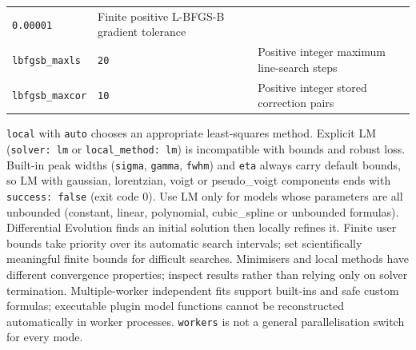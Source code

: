 \documentclass[
  10pt,
  a4paper,
  oneside]{scrreprt}
\begin{document}
\begin{longtable}[]{@{}lll@{}}
\begin{minipage}[t]{0.30\columnwidth}
\texttt{0.00001}\strut
\end{minipage} & \begin{minipage}[t]{0.30\columnwidth}\raggedright
Finite positive L-BFGS-B gradient tolerance\strut
\end{minipage}\tabularnewline
\begin{minipage}[t]{0.30\columnwidth}\raggedright
\texttt{lbfgsb\_maxls}\strut
\end{minipage} & \begin{minipage}[t]{0.30\columnwidth}\raggedright
\texttt{20}\strut
\end{minipage} & \begin{minipage}[t]{0.30\columnwidth}\raggedright
Positive integer maximum line-search steps\strut
\end{minipage}\tabularnewline
\begin{minipage}[t]{0.30\columnwidth}\raggedright
\texttt{lbfgsb\_maxcor}\strut
\end{minipage} & \begin{minipage}[t]{0.30\columnwidth}\raggedright
\texttt{10}\strut
\end{minipage} & \begin{minipage}[t]{0.30\columnwidth}\raggedright
Positive integer stored correction pairs\strut
\end{minipage}\tabularnewline
\bottomrule
\end{longtable}

\texttt{local} with \texttt{auto} chooses an appropriate least-squares
method. Explicit LM (\texttt{solver:\ lm} or
\texttt{local\_method:\ lm}) is incompatible with bounds and robust
loss. Built-in peak widths (\texttt{sigma}, \texttt{gamma},
\texttt{fwhm}) and \texttt{eta} always carry default bounds, so LM with
gaussian, lorentzian, voigt or pseudo\_voigt components ends with
\texttt{success:\ false} (exit code 0). Use LM only for models whose
parameters are all unbounded (constant, linear, polynomial,
cubic\_spline or unbounded formulas). Differential Evolution finds an
initial solution then locally refines it. Finite user bounds take
priority over its automatic search intervals; set scientifically
meaningful finite bounds for difficult searches. Minimisers and local
methods have different convergence properties; inspect results rather
than relying only on solver termination. Multiple-worker independent
fits support built-ins and safe custom formulas; executable plugin model
functions cannot be reconstructed automatically in worker processes.
\texttt{workers} is not a general parallelisation switch for every mode.
\end{document}
